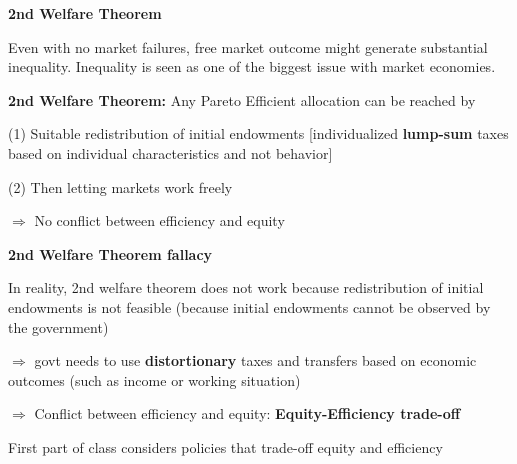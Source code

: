 \documentclass[landscape]{slides}
\begin{document}
\begin{slide}
\begin{center}
{\bf 2nd Welfare Theorem}
\end{center}

Even with no market failures, free market outcome might generate
substantial inequality. Inequality is seen as one of the biggest issue
with market economies.

{\bf 2nd Welfare Theorem:} Any Pareto Efficient allocation can be
reached by

(1) Suitable redistribution of initial endowments
[individualized {\bf lump-sum} taxes based on individual
characteristics and not behavior]

(2) Then letting markets work
freely

$\Rightarrow$ No conflict between efficiency and equity

\end{slide}

\begin{slide}
\begin{center}
{\bf 2nd Welfare Theorem fallacy}
\end{center}

In reality, 2nd welfare theorem does not work because redistribution of initial endowments is not feasible
(because initial endowments cannot be observed by the government)

$\Rightarrow$ govt needs to use {\bf distortionary} taxes
and transfers based on economic outcomes  (such as income or working situation)

$\Rightarrow$ Conflict between
efficiency and equity: \textbf{Equity-Efficiency trade-off}

First part of class considers policies that trade-off equity and efficiency


\end{slide}
\end{document}
